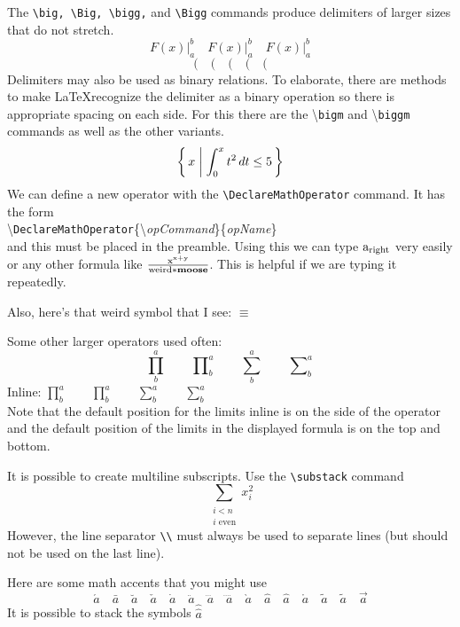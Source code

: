 \documentclass[12pt]{amsart}
\DeclareMathOperator{\aright}{a_{\textnormal{right}}}
\DeclareMathOperator{\weird}{\frac{x^{x + y}}{\textnormal{weird}*\textbf{moose}}}
\begin{document}
The \verb+\big, \Big, \bigg,+ and \verb+\Bigg+ commands produce delimiters of larger sizes that do not stretch. 
\[
   F(x) |^{b}_{a} \quad
   F(x) \big|^{b}_{a} \quad
   F(x) \Big|^{b}_{a}
\]
\[
(\quad \big(\quad \Big(\quad \bigg(\quad \Bigg(
\]
Delimiters may also be used as binary relations. To elaborate, there are methods to make \LaTeX recognize the delimiter as a binary operation so there is appropriate spacing on each side. For this there are the \textbackslash \texttt{bigm} and \textbackslash \texttt{biggm} commands as well as the other variants. 
\[
   \left\{ \, x \biggm| \int_0^x t^2 \, dt \leq 5 \, \right\}
\]
We can define a new operator with the \verb+\DeclareMathOperator+ command. It has the form \\
\textbackslash \texttt{DeclareMathOperator}\{\textbackslash\emph{opCommand}\}\{\emph{opName}\} \\
and this must be placed in the preamble. Using this we can type \(\aright\) very easily or any other formula like \(\weird\). This is helpful if we are typing it repeatedly.
\vspace{15pt}

Also, here's that weird symbol that I see: \( \equiv \)

Some other larger operators used often:
\[
   \prod ^a_b \qquad \prod\nolimits^a_b \qquad \sum^a_b \qquad \sum\nolimits^a_b
\]
Inline: \( \prod ^a_b \qquad \prod\limits^a_b \qquad \sum^a_b \qquad \sum\limits^a_b \) \\
Note that the default position for the limits inline is on the side of the operator and the default position of the limits in the displayed formula is on the top and bottom. 
\vspace{15pt}

It is possible to create multiline subscripts. Use the \verb+\substack+ command
\[
   \sum_{\substack{i < n \\
                               i \text{ even} } }
   x_i^2
\]
However, the line separator \verb+\\+ must always be used to separate lines (but should not be used on the last line). 
\vspace{15pt}

Here are some math accents that you might use
\[
   \acute{a} \quad \bar{a} \quad \breve{a} \quad \check{a} \quad \dot{a} \quad \ddot{a} \quad \dddot{a} \quad \ddddot{a} 
   \quad \grave{a} \quad \hat{a} \quad \widehat{a} \quad \mathring{a} \quad \tilde{a} \quad \widetilde{a} \quad \vec{a}
\]
It is possible to stack the symbols \( \hat{\hat{a}} \)
\vspace{15pt}
\end{document}

